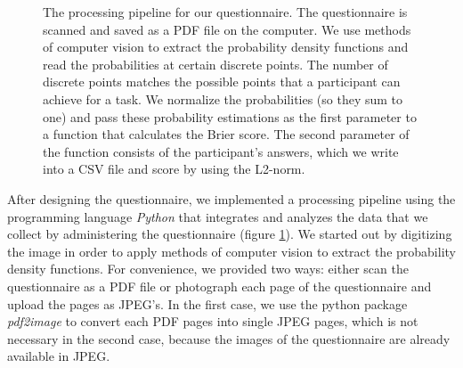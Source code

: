 \documentclass[../main/main.tex]{subfiles}
\begin{document}
\begin{figure}[H]
	\caption{The processing pipeline for our questionnaire. The questionnaire is scanned and saved as a PDF file on the computer. We use methods of computer vision to extract the probability density functions and read the probabilities at certain discrete points. The number of discrete points matches the possible points that a participant can achieve for a task. We normalize the probabilities (so they sum to one) and pass these probability estimations as the first parameter to a function that calculates the Brier score. The second parameter of the function consists of the participant's answers, which we write into a CSV file and score by using the L2-norm.}
	\label{fig:processing}
	\end{figure}

	After designing the questionnaire, we implemented a processing pipeline using the programming language \textit{Python} that integrates and analyzes the data that we collect by administering the questionnaire (figure \ref{fig:processing}). We started out by digitizing the image in order to apply methods of computer vision to extract the probability density functions. For convenience, we provided two ways: either scan the questionnaire as a PDF file or photograph each page of the questionnaire and upload the pages as JPEG's. In the first case, we use the python package \textit{pdf2image} \cite{pdf2images} to convert each PDF pages into single JPEG pages, which is not necessary in the second case, because the images of the questionnaire are already available in JPEG.  
\end{document}
